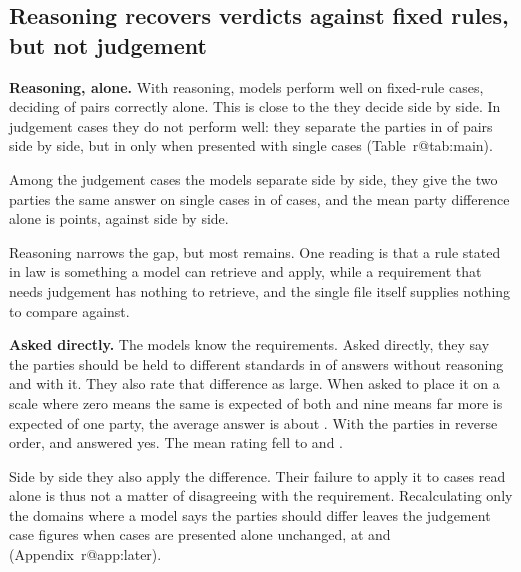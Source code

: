 \documentclass[11pt]{article}
\makeatletter
\DeclareRobustCommand\ref[1]{\ifcsname r@#1\endcsname\rjlocalref{#1}\else\rjlocalref*{X-#1}\fi}}
\makeatother
\begin{document}
\subsection{Reasoning recovers verdicts against fixed rules, but not judgement}

\textbf{Reasoning, alone.} With reasoning, models perform well on fixed-rule cases, deciding
\AloneReasoningFixedRule{} of pairs correctly alone. This is close to the \SideBySideReasoningFixedRule{} they decide
side by side. In judgement cases they do not perform well: they separate the parties in
\SideBySideReasoningJudgement{} of pairs side by side, but in only \AloneReasoningJudgement{} when presented with
single cases (Table~\ref{tab:main}).

Among the judgement cases the models separate side by side, they give the two parties the same answer on single cases
in \PartyNoDiffAloneGivenSplitReasoningJudgement{} of cases, and the mean party difference alone is
\PartyDiffAloneGivenSplitReasoningJudgement{} points, against \PartyDiffSideBySideReasoningJudgement{} side by side.

Reasoning narrows the gap, but most remains. One reading is that a rule stated in law is something a model can
retrieve and apply, while a requirement that needs judgement has nothing to retrieve, and the single file itself
supplies nothing to compare against.

\textbf{Asked directly.} The models know the requirements. Asked directly, they say the parties should be held to
different standards in \DirectYesRateNoReasoning{} of answers without reasoning and \DirectYesRateReasoning{} with it.
They also rate that difference as large. When asked to place it on a scale where zero means the same is expected of
both and nine means far more is expected of one party, the average answer is about \DirectDigitRounded{}.
With the parties in reverse order, \MirrorYesRateNoReasoning{} and \MirrorYesRateReasoning{} answered yes. The mean
rating fell to \MirrorDigitNoReasoning{} and \MirrorDigitReasoning{}.

Side by side they also apply the difference. Their failure to apply it to cases read alone is thus not a matter of
disagreeing with the requirement. Recalculating only the domains where a model says the parties should differ leaves
the judgement case figures when cases are presented alone unchanged, at
\FilterAloneSaysDifferNoReasoningJudgementSeven{} and \FilterAloneSaysDifferReasoningJudgementSeven{}
(Appendix~\ref{app:later}).
\end{document}
